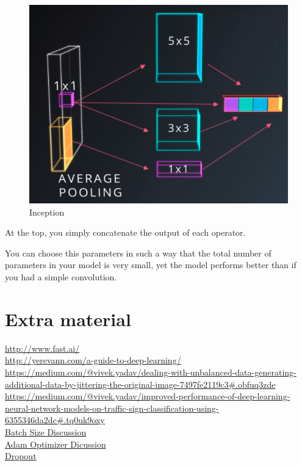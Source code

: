 \documentclass[11pt, a4paper]{article}
\begin{document}
 \begin{figure}[htpb!]
 	\centering
 	\includegraphics[width=0.8\linewidth]{inception}
 	\caption{Inception}
 	\label{fig:inception}
 \end{figure}


At the top, you simply concatenate the output of each operator. 

You can choose this parameters in such a way that the total number of parameters in your model is very small, yet the model performs better than if you had a simple convolution. 




\section{Extra material}%
\label{sec:extra_material}


\url{http://www.fast.ai/} \\
\url{http://yerevann.com/a-guide-to-deep-learning/} \\
\url{https://medium.com/@vivek.yadav/dealing-with-unbalanced-data-generating-additional-data-by-jittering-the-original-image-7497fe2119c3#.obfuq3zde} \\
\url{https://medium.com/@vivek.yadav/improved-performance-of-deep-learning-neural-network-models-on-traffic-sign-classification-using-6355346da2dc#.tq0uk9oxy} \\





\href{https://stats.stackexchange.com/questions/140811/how-large-should-the-batch-size-be-for-stochastic-gradient-descent}{Batch Size Discussion} \\
\href{http://ruder.io/optimizing-gradient-descent/index.html#adam}{Adam Optimizer Dicussion} \\
\href{https://pgaleone.eu/deep-learning/regularization/2017/01/10/anaysis-of-dropout/}{Dropout} \\
\end{document}
